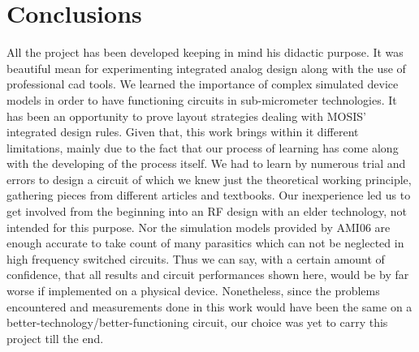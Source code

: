 \section{Conclusions}

All the project has been developed keeping in mind his didactic purpose. It was beautiful mean for experimenting integrated analog design along with the use of professional cad tools. We learned the importance of complex simulated device models in order to have functioning circuits in sub-micrometer technologies. It has been an opportunity to prove layout strategies dealing with MOSIS' integrated design rules.
Given that, this work brings within it different limitations, mainly due to the fact that our process of learning has come along with the developing of the process itself. We had to learn by numerous trial and errors to design a circuit of which we knew just the theoretical working principle, gathering pieces from different articles and textbooks. Our inexperience led us to get involved from the beginning into an RF design with an elder technology, not intended for this purpose. Nor the simulation models provided by AMI06 are enough accurate to take count of many parasitics which can not be neglected in high frequency switched circuits. Thus we can say, with a certain amount of confidence, that all results and circuit performances shown here, would be by far worse if implemented on a physical device.
Nonetheless, since the problems encountered and measurements done in this work would have been the same on a better-technology/better-functioning circuit, our choice was yet to carry this project till the end.